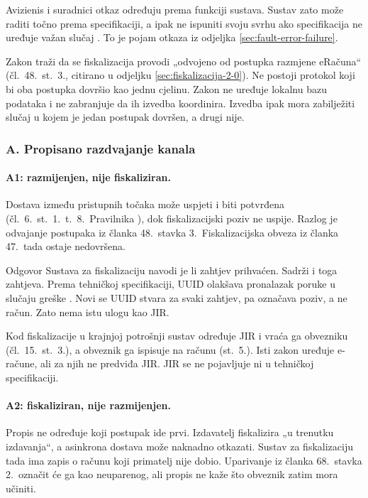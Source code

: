 Avizienis i suradnici otkaz određuju prema funkciji sustava. Sustav zato
može raditi točno prema specifikaciji, a ipak ne ispuniti svoju svrhu ako
specifikacija ne uređuje važan slučaj \cite{avizienis2004taxonomy}. To je
pojam otkaza iz odjeljka \ref{sec:fault-error-failure}.

Zakon traži da se fiskalizacija provodi „odvojeno od postupka razmjene
eRačuna“ (čl.~48.~st.~3., citirano u odjeljku
\ref{sec:fiskalizacija-2-0}). Ne postoji protokol koji bi oba postupka
dovršio kao jednu cjelinu. Zakon ne uređuje lokalnu bazu podataka i ne
zabranjuje da ih izvedba koordinira. Izvedba ipak mora zabilježiti slučaj u
kojem je jedan postupak dovršen, a drugi nije.

\subsubsection*{A. Propisano razdvajanje kanala}

\paragraph{A1: razmijenjen, nije fiskaliziran.}
Dostava između pristupnih točaka može uspjeti i biti potvrđena
(čl.~6.~st.~1.~t.~8.\ Pravilnika \cite{nn2026pravilnikeracun}), dok
fiskalizacijski poziv ne uspije. Razlog je odvajanje postupaka iz članka
48.\ stavka 3.\ Fiskalizacijska obveza iz članka 47.\ tada ostaje
nedovršena.

Odgovor Sustava za fiskalizaciju navodi je li zahtjev prihvaćen. Sadrži i
 toga zahtjeva. Prema tehničkoj specifikaciji, UUID
olakšava pronalazak poruke u slučaju greške \cite{pu2026tehspec}. Novi se UUID stvara za svaki
zahtjev, pa označava poziv, a ne račun. Zato nema istu ulogu kao JIR.

Kod fiskalizacije u krajnjoj potrošnji sustav određuje JIR i vraća ga
obvezniku (čl.~15.~st.~3.), a obveznik ga ispisuje na računu (st.~5.). Isti
zakon uređuje e-račune, ali za njih ne predviđa JIR. JIR se ne pojavljuje ni
u tehničkoj specifikaciji.

\paragraph{A2: fiskaliziran, nije razmijenjen.}
Propis ne određuje koji postupak ide prvi. Izdavatelj fiskalizira „u
trenutku izdavanja“, a asinkrona dostava može naknadno otkazati. Sustav za
fiskalizaciju tada ima zapis o računu koji primatelj nije dobio. Uparivanje
iz članka 68.\ stavka 2.\ označit će ga kao neuparenog, ali propis ne kaže
što obveznik zatim mora učiniti.

